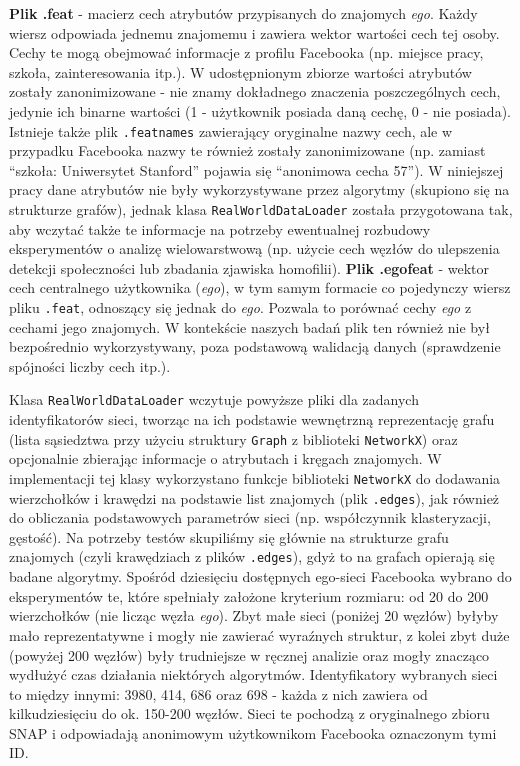 \textbf{Plik .feat} - macierz cech atrybutów przypisanych do znajomych \textit{ego}. Każdy wiersz odpowiada jednemu znajomemu i zawiera wektor wartości cech tej osoby. Cechy te mogą obejmować informacje z profilu Facebooka (np. miejsce pracy, szkoła, zainteresowania itp.). W udostępnionym zbiorze wartości atrybutów zostały zanonimizowane - nie znamy dokładnego znaczenia poszczególnych cech, jedynie ich binarne wartości (1 - użytkownik posiada daną cechę, 0 - nie posiada). Istnieje także plik \verb|.featnames| zawierający oryginalne nazwy cech, ale w przypadku Facebooka nazwy te również zostały zanonimizowane (np. zamiast ``szkoła: Uniwersytet Stanford'' pojawia się ``anonimowa cecha 57''). W niniejszej pracy dane atrybutów nie były wykorzystywane przez algorytmy (skupiono się na strukturze grafów), jednak klasa \verb|RealWorldDataLoader| została przygotowana tak, aby wczytać także te informacje na potrzeby ewentualnej rozbudowy eksperymentów o analizę wielowarstwową (np. użycie cech węzłów do ulepszenia detekcji społeczności lub zbadania zjawiska homofilii).
\textbf{Plik .egofeat} - wektor cech centralnego użytkownika (\textit{ego}), w tym samym formacie co pojedynczy wiersz pliku \verb|.feat|, odnoszący się jednak do \textit{ego}. Pozwala to porównać cechy \textit{ego} z cechami jego znajomych. W kontekście naszych badań plik ten również nie był bezpośrednio wykorzystywany, poza podstawową walidacją danych (sprawdzenie spójności liczby cech itp.).

Klasa \verb|RealWorldDataLoader| wczytuje powyższe pliki dla zadanych identyfikatorów sieci, tworząc na ich podstawie wewnętrzną reprezentację grafu (lista sąsiedztwa przy użyciu struktury \verb|Graph| z biblioteki \texttt{NetworkX}) oraz opcjonalnie zbierając informacje o atrybutach i kręgach znajomych. W implementacji tej klasy wykorzystano funkcje biblioteki \texttt{NetworkX} do dodawania wierzchołków i krawędzi na podstawie list znajomych (plik \verb|.edges|), jak również do obliczania podstawowych parametrów sieci (np. współczynnik klasteryzacji, gęstość). Na potrzeby testów skupiliśmy się głównie na strukturze grafu znajomych (czyli krawędziach z plików \verb|.edges|), gdyż to na grafach opierają się badane algorytmy. Spośród dziesięciu dostępnych ego-sieci Facebooka wybrano do eksperymentów te, które spełniały założone kryterium rozmiaru: od 20 do 200 wierzchołków (nie licząc węzła \textit{ego}). Zbyt małe sieci (poniżej 20 węzłów) byłyby mało reprezentatywne i mogły nie zawierać wyraźnych struktur, z kolei zbyt duże (powyżej 200 węzłów) były trudniejsze w ręcznej analizie oraz mogły znacząco wydłużyć czas działania niektórych algorytmów. Identyfikatory wybranych sieci to między innymi: 3980, 414, 686 oraz 698 - każda z nich zawiera od kilkudziesięciu do ok. 150-200 węzłów. Sieci te pochodzą z oryginalnego zbioru SNAP i odpowiadają anonimowym użytkownikom Facebooka oznaczonym tymi ID.

